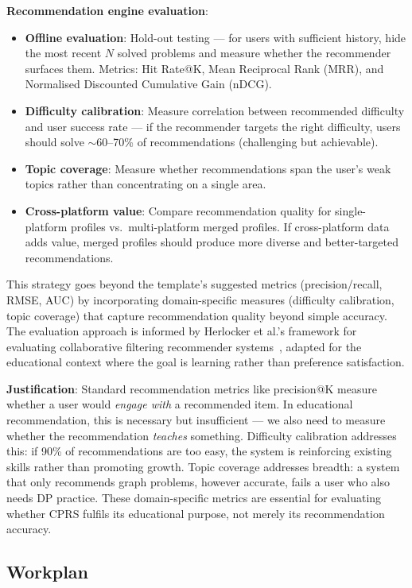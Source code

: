 \documentclass[12pt,a4paper]{article}
\begin{document}
\textbf{Recommendation engine evaluation}:
\begin{itemize}
    \item \textbf{Offline evaluation}: Hold-out testing --- for users with sufficient history, hide the most recent $N$ solved problems and measure whether the recommender surfaces them. Metrics: Hit Rate@K, Mean Reciprocal Rank (MRR), and Normalised Discounted Cumulative Gain (nDCG).
    \item \textbf{Difficulty calibration}: Measure correlation between recommended difficulty and user success rate --- if the recommender targets the right difficulty, users should solve ${\sim}60$--70\% of recommendations (challenging but achievable).
    \item \textbf{Topic coverage}: Measure whether recommendations span the user's weak topics rather than concentrating on a single area.
    \item \textbf{Cross-platform value}: Compare recommendation quality for single-platform profiles vs.\ multi-platform merged profiles. If cross-platform data adds value, merged profiles should produce more diverse and better-targeted recommendations.
\end{itemize}

This strategy goes beyond the template's suggested metrics (precision/recall, RMSE, AUC) by incorporating domain-specific measures (difficulty calibration, topic coverage) that capture recommendation quality beyond simple accuracy. The evaluation approach is informed by Herlocker et al.'s framework for evaluating collaborative filtering recommender systems~\cite{herlocker2004}, adapted for the educational context where the goal is learning rather than preference satisfaction.

\textbf{Justification}: Standard recommendation metrics like precision@K measure whether a user would \emph{engage with} a recommended item. In educational recommendation, this is necessary but insufficient --- we also need to measure whether the recommendation \emph{teaches} something. Difficulty calibration addresses this: if 90\% of recommendations are too easy, the system is reinforcing existing skills rather than promoting growth. Topic coverage addresses breadth: a system that only recommends graph problems, however accurate, fails a user who also needs DP practice. These domain-specific metrics are essential for evaluating whether CPRS fulfils its educational purpose, not merely its recommendation accuracy.

\subsection{Workplan}
\end{document}
